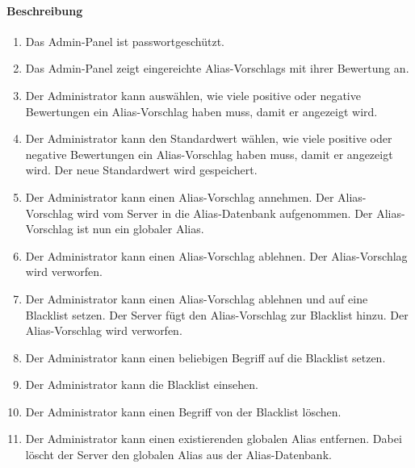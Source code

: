 \paragraph{Beschreibung}
\begin{enumerate}[start=101, label=\textbf{/FA\arabic*/}, align=left]
    \item Das \Gls{Admin-Panel} ist passwortgeschützt.
    \item Das \Gls{Admin-Panel} zeigt eingereichte \Glspl{Alias-Vorschlag} mit ihrer Bewertung an.
    \item Der \Gls{Administrator} kann auswählen, wie viele positive oder negative Bewertungen ein \Gls{Alias-Vorschlag} haben muss, damit er angezeigt wird.
    \item Der \Gls{Administrator} kann den Standardwert wählen, wie viele positive oder negative Bewertungen ein \Gls{Alias-Vorschlag} haben muss, damit er angezeigt wird. Der neue Standardwert wird gespeichert.
    \item Der \Gls{Administrator} kann einen \Gls{Alias-Vorschlag} annehmen. Der \Gls{Alias-Vorschlag} wird vom \Gls{Server} in die \Gls{Alias}-\Gls{Datenbank} aufgenommen. Der \Gls{Alias-Vorschlag} ist nun ein \gls{global}er \Gls{Alias}.
    \item Der \Gls{Administrator} kann einen \Gls{Alias-Vorschlag} ablehnen. Der \Gls{Alias-Vorschlag} wird verworfen.
    \item Der \Gls{Administrator} kann einen \Gls{Alias-Vorschlag} ablehnen und auf eine \Gls{Blacklist} setzen. Der \Gls{Server} fügt den {Alias-Vorschlag} zur \Gls{Blacklist} hinzu. Der \Gls{Alias-Vorschlag} wird verworfen.
    \item Der \Gls{Administrator} kann einen beliebigen Begriff auf die \Gls{Blacklist} setzen.
    \item Der \Gls{Administrator} kann die \Gls{Blacklist} einsehen.
    \item Der \Gls{Administrator} kann einen Begriff von der \Gls{Blacklist} löschen.
    \item Der \Gls{Administrator} kann einen existierenden \gls{global}en \Gls{Alias} entfernen. Dabei löscht der \Gls{Server} den \gls{global}en \Gls{Alias} aus der \Gls{Alias}-\Gls{Datenbank}.
\end{enumerate}